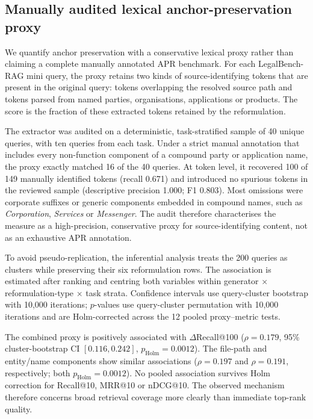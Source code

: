\documentclass[a4paper,fleqn]{cas-dc}
\begin{document}
\subsection{Manually audited lexical anchor-preservation proxy}
\label{sec:apr-correlation}

We quantify anchor preservation with a conservative lexical proxy rather
than claiming a complete manually annotated APR benchmark. For each
LegalBench-RAG mini query, the proxy retains two kinds of source-identifying
tokens that are present in the original query: tokens overlapping the
resolved source path and tokens parsed from named parties, organisations,
applications or products. The score is the fraction of these extracted
tokens retained by the reformulation.

The extractor was audited on a deterministic, task-stratified sample of
40 unique queries, with ten queries from each task. Under a strict manual
annotation that includes every non-function component of a compound
party or application name, the proxy exactly matched 16 of the 40
queries. At token level, it recovered 100 of 149 manually identified
tokens (recall 0.671) and introduced no spurious tokens in the reviewed
sample (descriptive precision 1.000; F1 0.803). Most omissions were
corporate suffixes or generic components embedded in compound names,
such as \textit{Corporation}, \textit{Services} or \textit{Messenger}.
The audit therefore characterises the measure as a high-precision,
conservative proxy for source-identifying content, not as an exhaustive
APR annotation.

To avoid pseudo-replication, the inferential analysis treats the 200
queries as clusters while preserving their six reformulation rows.
The association is estimated after ranking and centring both variables
within generator $\times$ reformulation-type $\times$ task strata.
Confidence intervals use query-cluster bootstrap with 10,000 iterations;
$p$-values use query-cluster permutation with 10,000 iterations and are
Holm-corrected across the 12 pooled proxy--metric tests.



The combined proxy is positively associated with
$\Delta$Recall@100 ($\rho=0.179$, 95\% cluster-bootstrap
CI $[0.116,0.242]$, $p_{\mathrm{Holm}}=0.0012$).
The file-path and entity/name components show similar associations
($\rho=0.197$ and $\rho=0.191$, respectively; both
$p_{\mathrm{Holm}}=0.0012$). No pooled association survives Holm
correction for Recall@10, MRR@10 or nDCG@10. The observed mechanism
therefore concerns broad retrieval coverage more clearly than immediate
top-rank quality.
\end{document}
